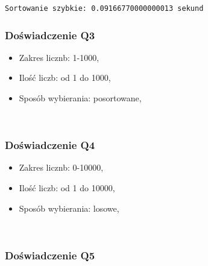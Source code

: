 \documentclass[11pt]{article}
\providecommand{\tightlist}{%
      \setlength{\itemsep}{0pt}\setlength{\parskip}{0pt}}
\begin{document}
    \begin{Verbatim}[commandchars=\\\{\}]
Sortowanie szybkie: 0.09166770000000013 sekund
    \end{Verbatim}

    \hypertarget{doux15bwiadczenie-q3}{%
\subsubsection{Doświadczenie Q3}\label{doux15bwiadczenie-q3}}

\begin{itemize}
\tightlist
\item
  Zakres licznb: 1-1000,
\item
  Ilość liczb: od 1 do 1000,
\item
  Sposób wybierania: posortowane,
\end{itemize}

    \begin{center}
    \end{center}
    { \hspace*{\fill} \\}
    
    \hypertarget{doux15bwiadczenie-q4}{%
\subsubsection{Doświadczenie Q4}\label{doux15bwiadczenie-q4}}

\begin{itemize}
\tightlist
\item
  Zakres licznb: 0-10000,
\item
  Ilość liczb: od 1 do 10000,
\item
  Sposób wybierania: losowe,
\end{itemize}

    \begin{center}
    \end{center}
    { \hspace*{\fill} \\}
    
    \hypertarget{doux15bwiadczenie-q5}{%
\subsubsection{Doświadczenie Q5}\label{doux15bwiadczenie-q5}}
\end{document}
